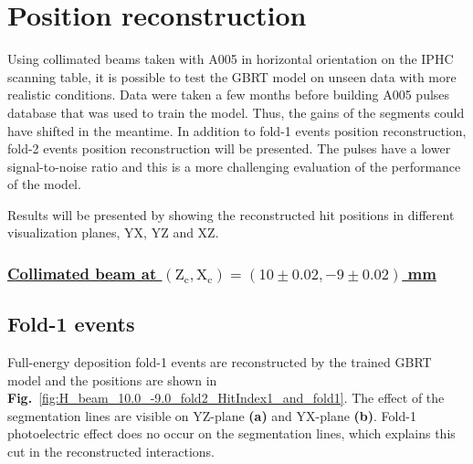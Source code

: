 \section{Position reconstruction}
\label{sec:position_reconstruction}
Using collimated beams taken with A005 in horizontal orientation on the IPHC scanning table, it is possible to test the GBRT model on unseen data with more realistic conditions. Data were taken a few months before building A005 pulses database that was used to train the model. Thus, the gains of the segments could have shifted in the meantime. In addition to fold-1 events position reconstruction, fold-2 events position reconstruction will be presented. The pulses have a lower signal-to-noise ratio and this is a more challenging evaluation of the performance of the model.

Results will be presented by showing the reconstructed hit positions in different visualization planes, YX, YZ and XZ.

\subsubsection*{\underline{Collimated beam at $(\text{Z}_\text{c}, \text{X}_\text{c})= (10\pm0.02, -9\pm0.02)$ mm}}
\subsection{Fold-1 events}

Full-energy deposition fold-1 events are reconstructed by the trained GBRT model and the positions are shown in \textbf{Fig.}~\ref{fig:H_beam_10.0_-9.0_fold2_HitIndex1_and_fold1}. The effect of the segmentation lines are visible on YZ-plane \textbf{(a)} and YX-plane \textbf{(b)}. Fold-1 photoelectric effect does no occur on the segmentation lines, which explains this cut in the reconstructed interactions. 


